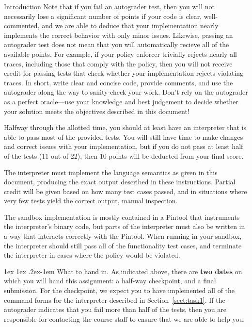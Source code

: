 \documentclass[11pt]{article}
\makeatletter
\renewcommand{\paragraph}{%
  \@startsection{paragraph}{4}%
  {\z@}{1ex \@plus 1ex \@minus .2ex}{-1em}%
  {\normalfont\normalsize\bfseries}
}
\makeatother
\begin{document}
\begin{problem}{Introduction}
    Note that if you fail an autograder test, then you will not necessarily lose a significant number of points if your code is clear, well-commented, and we are able to deduce that your implementation nearly implements the correct behavior with only minor issues.
    Likewise, passing an autograder test does not mean that you will automatically recieve all of the available points. For example, if your policy enforcer trivially rejects nearly all traces, including those that comply with the policy, then you will not receive credit for passing tests that check whether your implementation rejects violating traces.
    In short, write clear and concise code, provide comments, and use the autograder along the way to sanity-check your work.
    Don't rely on the autograder as a perfect oracle---use your knowledge and best judgement to decide whether your solution meets the objectives described in this document!
    \begin{description}[noitemsep,topsep=0pt]
      \item[Checkpoint (10 point deduction for missing).] Halfway through the allotted time, you should at least have an interpreter that is able to pass most of the provided tests.
      You will still have time to make changes and correct issues with your implementation, but if you do not pass at least half of the tests (11 out of 22), then 10 points will be deducted from your final score.
      \item[Correct interpreter (40 points).] The interpreter must implement the language semantics as given in this document, producing the exact output described in these instructions. Partial credit will be given based on how many test cases passed, and in situations where very few tests yield the correct output, manual inspection.
      \item[Correct sandbox implementation (60 points, 15 possible extra credit).] The sandbox implementation is mostly contained in a Pintool that instruments the interpreter's binary code, but parts of the interpreter must also be written in a way that interacts correctly with the Pintool. When running in your sandbox, the interpreter should still pass all of the functionality test cases, and terminate the interpreter in cases where the policy would be violated.
    \end{description}
\end{problem}

\paragraph{What to hand in.}
As indicated above, there are \textbf{\color{red} two dates} on which you will hand this assignment: a half-way checkpoint, and a final submission.
For the checkpoint, we expect you to have implemented all of the command forms for the interpreter described in Section~\ref{sect:task1}. 
If the autograder indicates that you fail more than half of the tests, then you are responsible for contacting the course staff to ensure that we are able to help you.
\end{document}
